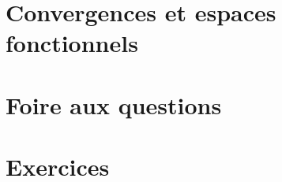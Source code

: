 

\chapter{Convergences et espaces fonctionnels}
	

\chapter{Foire aux questions}
	

\chapter{Exercices}
	
	
